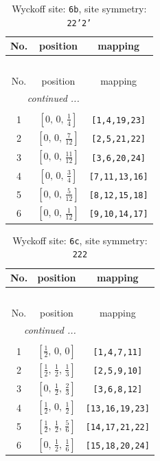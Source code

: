 \documentclass[fleqn,8pt]{jsarticle}
\begin{document}
\begin{longtable}{ccc}
\caption{Wyckoff site: {\tt 6b}, site symmetry: {\tt 22'2'}}
 \\
 \hline \hline
No. & position & mapping \\ \hline \endfirsthead

\multicolumn{2}{l}{\tablename\ \thetable{}} \\
 \hline \hline
No. & position & mapping \\ \hline \endhead

 \hline \hline
\multicolumn{2}{r}{\footnotesize\it continued ...} \\ \endfoot

 \hline \hline
\multicolumn{2}{r}{} \\ \endlastfoot

1 & $\left[ 0,\, 0,\, \frac{1}{4} \right]$ & {\tt [1,4,19,23]} \\ \hline
2 & $\left[ 0,\, 0,\, \frac{7}{12} \right]$ & {\tt [2,5,21,22]} \\ \hline
3 & $\left[ 0,\, 0,\, \frac{11}{12} \right]$ & {\tt [3,6,20,24]} \\ \hline
4 & $\left[ 0,\, 0,\, \frac{3}{4} \right]$ & {\tt [7,11,13,16]} \\ \hline
5 & $\left[ 0,\, 0,\, \frac{5}{12} \right]$ & {\tt [8,12,15,18]} \\ \hline
6 & $\left[ 0,\, 0,\, \frac{1}{12} \right]$ & {\tt [9,10,14,17]} \\
\end{longtable}
\renewcommand{\arraystretch}{1.2}
\begin{longtable}{ccc}
\caption{Wyckoff site: {\tt 6c}, site symmetry: {\tt 222}}
 \\
 \hline \hline
No. & position & mapping \\ \hline \endfirsthead

\multicolumn{2}{l}{\tablename\ \thetable{}} \\
 \hline \hline
No. & position & mapping \\ \hline \endhead

 \hline \hline
\multicolumn{2}{r}{\footnotesize\it continued ...} \\ \endfoot

 \hline \hline
\multicolumn{2}{r}{} \\ \endlastfoot

1 & $\left[ \frac{1}{2},\, 0,\, 0 \right]$ & {\tt [1,4,7,11]} \\ \hline
2 & $\left[ \frac{1}{2},\, \frac{1}{2},\, \frac{1}{3} \right]$ & {\tt [2,5,9,10]} \\ \hline
3 & $\left[ 0,\, \frac{1}{2},\, \frac{2}{3} \right]$ & {\tt [3,6,8,12]} \\ \hline
4 & $\left[ \frac{1}{2},\, 0,\, \frac{1}{2} \right]$ & {\tt [13,16,19,23]} \\ \hline
5 & $\left[ \frac{1}{2},\, \frac{1}{2},\, \frac{5}{6} \right]$ & {\tt [14,17,21,22]} \\ \hline
6 & $\left[ 0,\, \frac{1}{2},\, \frac{1}{6} \right]$ & {\tt [15,18,20,24]} \\
\end{longtable}
\end{document}
